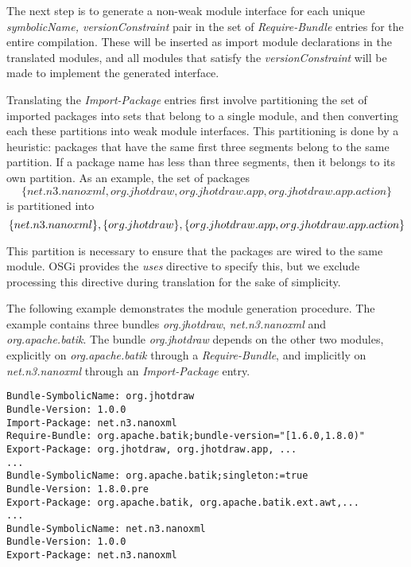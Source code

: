 The next step is to generate a non-weak module interface for each unique \textit{symbolicName, versionConstraint}
pair in the set of \textit{Require-Bundle} entries for the entire compilation. These will be inserted 
as import module declarations in the translated modules, and all modules that satisfy the \textit{versionConstraint}
will be made to implement the generated interface.

Translating the \textit{Import-Package} entries first involve partitioning the set of imported 
packages into sets that belong to a single module, and then converting each these partitions into
weak module interfaces. This partitioning is done by a heuristic: packages that have the same first
three segments belong to the same partition. If a package name has less than three segments, then
it belongs to its own partition. As an example, the set of packages\\
\[
\{net.n3.nanoxml, org.jhotdraw, org.jhotdraw.app, org.jhotdraw.app.action\}
\]
is partitioned into\\
\[\{net.n3.nanoxml\}, \{org.jhotdraw\}, \\ \{org.jhotdraw.app, org.jhotdraw.app.action\}\]

This partition is necessary to ensure that the packages are wired to the same module. OSGi provides
the \textit{uses} directive to specify this, but we exclude processing this directive during translation 
for the sake of simplicity.

The following example demonstrates the module generation procedure. The example contains three bundles
\textit{org.jhotdraw}, \textit{net.n3.nanoxml} and \textit{org.apache.batik}. The bundle \textit{org.jhotdraw}
depends on the other two modules, explicitly on \textit{org.apache.batik} through a \textit{Require-Bundle}, 
and implicitly on \textit{net.n3.nanoxml} through an \textit{Import-Package} entry.

\begin{lstlisting}[caption=Bundle Translation Example]
Bundle-SymbolicName: org.jhotdraw
Bundle-Version: 1.0.0
Import-Package: net.n3.nanoxml
Require-Bundle: org.apache.batik;bundle-version="[1.6.0,1.8.0)"
Export-Package: org.jhotdraw, org.jhotdraw.app, ...
...
Bundle-SymbolicName: org.apache.batik;singleton:=true
Bundle-Version: 1.8.0.pre
Export-Package: org.apache.batik, org.apache.batik.ext.awt,...
...
Bundle-SymbolicName: net.n3.nanoxml
Bundle-Version: 1.0.0
Export-Package: net.n3.nanoxml
\end{lstlisting}

